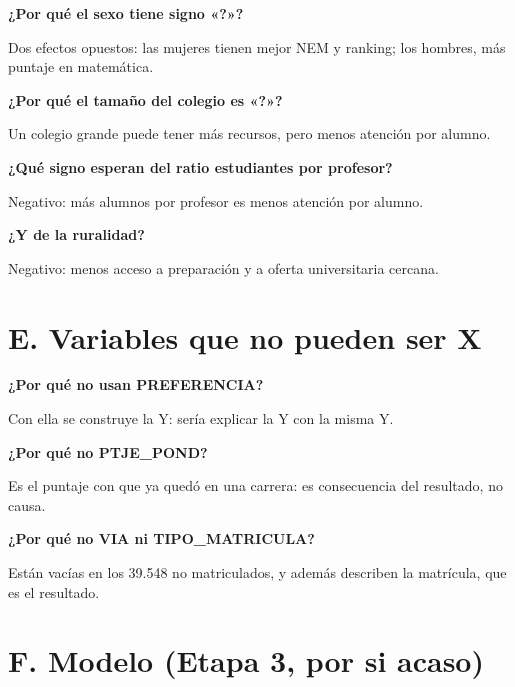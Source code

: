 \documentclass[11pt]{article}
\begin{document}
\textbf{¿Por qué el sexo tiene signo «?»?}\par
\begin{guion}Dos efectos opuestos: las mujeres tienen mejor NEM y ranking; los hombres, más puntaje en matemática.\end{guion}

\textbf{¿Por qué el tamaño del colegio es «?»?}\par
\begin{guion}Un colegio grande puede tener más recursos, pero menos atención por alumno.\end{guion}

\textbf{¿Qué signo esperan del ratio estudiantes por profesor?}\par
\begin{guion}Negativo: más alumnos por profesor es menos atención por alumno.\end{guion}

\textbf{¿Y de la ruralidad?}\par
\begin{guion}Negativo: menos acceso a preparación y a oferta universitaria cercana.\end{guion}

\section*{E. Variables que no pueden ser X}

\textbf{¿Por qué no usan PREFERENCIA?}\par
\begin{guion}Con ella se construye la Y: sería explicar la Y con la misma Y.\end{guion}

\textbf{¿Por qué no PTJE\_POND?}\par
\begin{guion}Es el puntaje con que ya quedó en una carrera: es consecuencia del resultado, no causa.\end{guion}

\textbf{¿Por qué no VIA ni TIPO\_MATRICULA?}\par
\begin{guion}Están vacías en los 39.548 no matriculados, y además describen la matrícula, que es el resultado.\end{guion}

\section*{F. Modelo (Etapa 3, por si acaso)}
\end{document}
